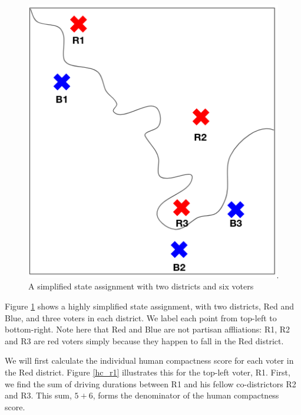 \documentclass[]{article}
\begin{document}
\begin{figure}
\centering
\includegraphics{img/human_compactness_1.png}
\caption{A simplified state assignment with two districts and six voters
\label{hc_demo}}
\end{figure}

Figure \ref{hc_demo} shows a highly simplified state assignment, with
two districts, Red and Blue, and three voters in each district. We label
each point from top-left to bottom-right. Note here that Red and Blue
are not partisan affliations: R1, R2 and R3 are red voters simply
because they happen to fall in the Red district.

We will first calculate the individual human compactness score for each
voter in the Red district. Figure \ref{hc_r1} illustrates this for the
top-left voter, R1. First, we find the sum of driving durations between
R1 and his fellow co-districtors R2 and R3. This sum, \(5 + 6\), forms
the denominator of the human compactness score.
\end{document}
